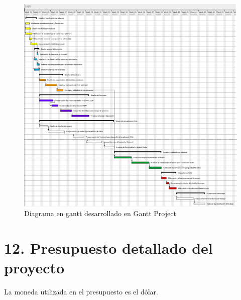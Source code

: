 \documentclass[
11pt, %
]{charter}
\begin{document}
\begin{landscape}
\begin{figure}[htpb]
\centering 
\includegraphics[height=1\textheight]{./Figuras/gantt2.png}
\caption{Diagrama en gantt desarrollado en Gantt Project} 
\label{fig:Gantt2}
\end{figure}

\end{landscape}


\section{12. Presupuesto detallado del proyecto}
\label{sec:presupuesto}

La moneda utilizada en el presupuesto es el dólar.
\end{document}
